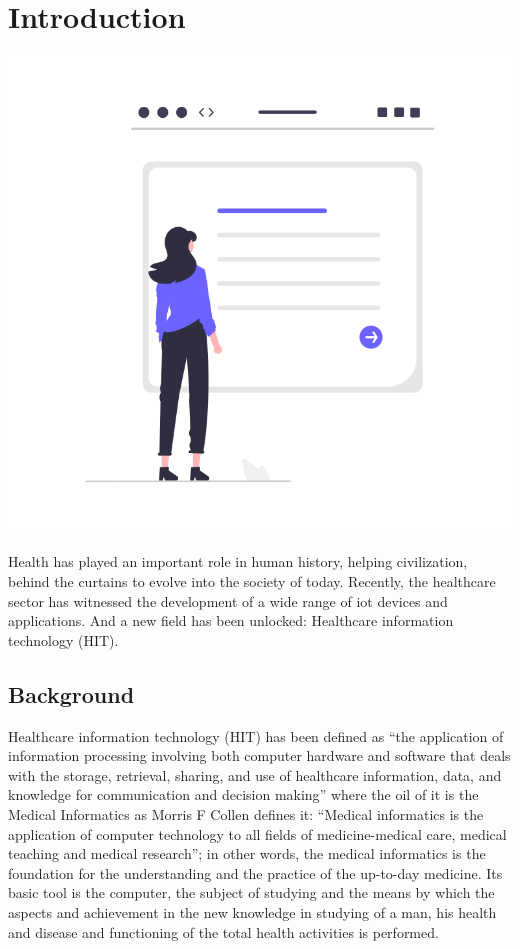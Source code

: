 
\chapter{Introduction}





\label{chapitre1}
		
		\includegraphics [width=1 \linewidth, height=0.8\textheight, keepaspectratio] {images/chaptersFigures/intro.png}
		
	
		
    \newpage
    \thispagestyle{plain}

Health has played an important role in human history, helping civilization, behind the curtains to evolve into the society of today\cite{xu2020privacy}. Recently, the healthcare sector has witnessed the development of a wide range of \gls{iot} devices and applications\cite{nasiri2019security}. And a new field has been unlocked: Healthcare information technology (HIT).

\section{Background}
Healthcare information technology (HIT) has been defined as \enquote{the application of information processing involving both computer hardware and software that deals with the storage, retrieval, sharing, and use of healthcare information, data, and knowledge for communication and decision making\cite{brailer2004decade}} where the oil of it is the Medical Informatics as Morris F Collen defines it: \enquote{Medical informatics is the application of computer technology to all fields of medicine-medical care, medical teaching and medical research}; in other words, the medical informatics is the foundation for the understanding and the practice of the up-to-day medicine. Its basic tool is the computer, the subject of studying and the means by which the aspects and achievement in the new knowledge in studying of a man, his health and disease and functioning of the total health activities is performed\cite{masic2013history}.

